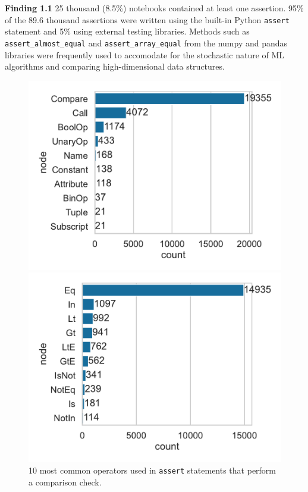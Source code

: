 \documentclass[smallextended]{svjour3}       %
\newcommand{\highlight}[1]{\begin{framed}%
  \noindent#1
\end{framed}}
\begin{document}
\highlight{\textbf{Finding 1.1} 25 thousand (8.5\%) notebooks contained at least one assertion. 95\% of the 89.6 thousand assertions were written using the built-in Python \lstinline{assert} statement and 5\% using external testing libraries. Methods such as \lstinline{assert_almost_equal} and \lstinline{assert_array_equal} from the numpy and pandas libraries were frequently used to accomodate for the stochastic nature of ML algorithms and comparing high-dimensional data structures.}

\begin{figure}
  \centering
  \begin{minipage}{0.49\textwidth}
    \centering
    \includegraphics[width=\linewidth]{common-assert-test.pdf}
    \caption{10 most common AST nodes in the test attribute of \lstinline{assert} statements.}
    \label{fig:common-assert-test}
  \end{minipage}
  \hfill
  \begin{minipage}{0.49\textwidth}
    \centering
    \includegraphics[width=\linewidth]{common-compare-op.pdf}
    \caption{10 most common operators used in \lstinline{assert} statements that perform a comparison check.}
    \label{fig:common-compare-op}
  \end{minipage}
\end{figure}
\end{document}
